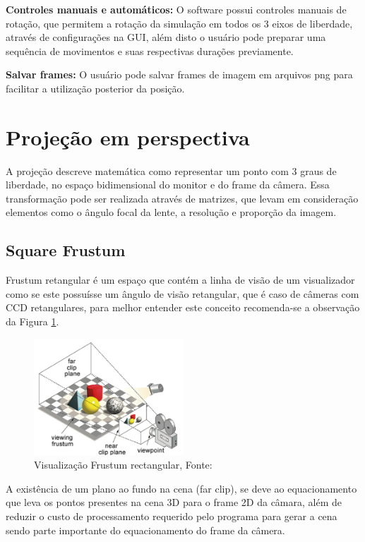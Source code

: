 \textbf{Controles manuais e automáticos:} O software possui controles manuais de rotação, que permitem a rotação da simulação em todos os 3 eixos de liberdade, através de configurações na GUI, além disto o usuário pode preparar uma sequência de movimentos e suas respectivas durações previamente.

\textbf{Salvar frames:} O usuário pode salvar frames de imagem em arquivos png para facilitar a utilização posterior da posição.

\section{Projeção em perspectiva}

A projeção descreve matemática como representar um ponto com 3 graus de liberdade, no espaço bidimensional do monitor e do frame da câmera. Essa transformação pode ser realizada através de matrizes, que levam em consideração elementos como o ângulo focal da lente, a resolução e proporção da imagem.

\subsection{Square Frustum}

Frustum retangular é um espaço que contém a linha de visão de  um visualizador como se este possuísse um ângulo de visão retangular, que é caso de câmeras com CCD retangulares, para melhor entender este conceito recomenda-se a observação da Figura \ref{fig:frustum}.

\begin{figure}[h]
    \centering
    \includegraphics[width=0.5\textwidth]{images/frustum.png}
    \caption{Visualização Frustum rectangular, Fonte: ~\cite[]{the_free_dictionary}}
    \label{fig:frustum}
\end{figure}

A existência de um plano ao fundo na cena (far clip), se deve ao equacionamento que leva os pontos presentes na cena 3D para o frame 2D da câmara, além de reduzir o custo de processamento requerido pelo programa para gerar a cena sendo parte importante do equacionamento do frame da câmera.

